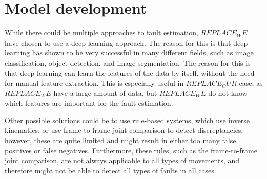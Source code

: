 \chapter{Model development}
\label{sec:model_development}

While there could be multiple approaches to fault estimation, $REPLACE_WE$ have chosen to use a deep learning approach. The reason for this is that deep learning has shown to be very successful in many different fields, such as image classification, object detection, and image segmentation. The reason for this is that deep learning can learn the features of the data by itself, without the need for manual feature extraction. This is especially useful in $REPLACE_OUR$ case, as $REPLACE_WE$ have a large amount of data, but $REPLACE_WE$ do not know which features are important for the fault estimation.

Other possible solutions could be to use rule-based systems, which use inverse kinematics, or use frame-to-frame joint comparison to detect discreptancies, however, these are quite limited and might result in either too many false positives or false negatives. Furthermore, these rules, such as the frame-to-frame joint comparison, are not always applicable to all types of movements, and therefore might not be able to detect all types of faults in all cases.




